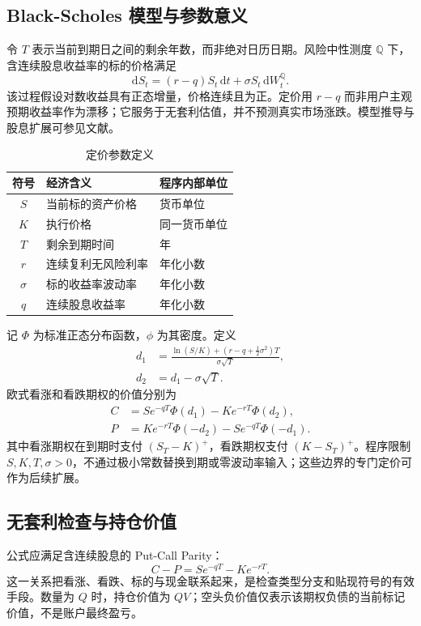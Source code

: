 \documentclass[UTF8,a4paper,12pt]{ctexart}
\begin{document}
\subsection{Black-Scholes 模型与参数意义}
令 $T$ 表示当前到期日之间的剩余年数，而非绝对日历日期。风险中性测度 $\mathbb Q$ 下，含连续股息收益率的标的价格满足
\begin{equation}
\mathrm dS_t=(r-q)S_t\,\mathrm dt+\sigma S_t\,\mathrm dW_t^{\mathbb Q}.
\end{equation}
该过程假设对数收益具有正态增量，价格连续且为正。定价用 $r-q$ 而非用户主观预期收益率作为漂移；它服务于无套利估值，并不预测真实市场涨跌。模型推导与股息扩展可参见文献\cite{haugh}。

\begin{table}[H]\centering
\begin{tabular}{cll}\toprule 符号 & 经济含义 & 程序内部单位\\\midrule
$S$ & 当前标的资产价格 & 货币单位\\
$K$ & 执行价格 & 同一货币单位\\
$T$ & 剩余到期时间 & 年\\
$r$ & 连续复利无风险利率 & 年化小数\\
$\sigma$ & 标的收益率波动率 & 年化小数\\
$q$ & 连续股息收益率 & 年化小数\\\bottomrule
\end{tabular}\caption{定价参数定义}
\end{table}

记 $\Phi$ 为标准正态分布函数，$\phi$ 为其密度。定义
\begin{align}
d_1&=\frac{\ln(S/K)+(r-q+\frac12\sigma^2)T}{\sigma\sqrt T},\\
d_2&=d_1-\sigma\sqrt T.
\end{align}
欧式看涨和看跌期权的价值分别为
\begin{align}
C&=Se^{-qT}\Phi(d_1)-Ke^{-rT}\Phi(d_2),\label{eq:call}\\
P&=Ke^{-rT}\Phi(-d_2)-Se^{-qT}\Phi(-d_1).\label{eq:put}
\end{align}
其中看涨期权在到期时支付 $(S_T-K)^+$，看跌期权支付 $(K-S_T)^+$。程序限制 $S,K,T,\sigma>0$，不通过极小常数替换到期或零波动率输入；这些边界的专门定价可作为后续扩展。

\subsection{无套利检查与持仓价值}
公式应满足含连续股息的 Put-Call Parity：
\begin{equation}
C-P=Se^{-qT}-Ke^{-rT}.
\end{equation}
这一关系把看涨、看跌、标的与现金联系起来，是检查类型分支和贴现符号的有效手段。数量为 $Q$ 时，持仓价值为 $QV$；空头负价值仅表示该期权负债的当前标记价值，不是账户最终盈亏。
\newpage
\end{document}
